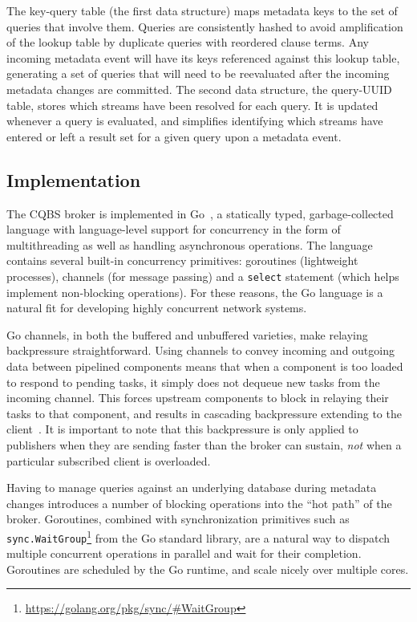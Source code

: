 The key-query table (the first data structure) maps metadata keys to the set of queries that involve them.
Queries are consistently hashed to avoid amplification of the lookup table by duplicate queries with reordered clause terms.
Any incoming metadata event will have its keys referenced against this lookup table, generating a set of queries that will need to be reevaluated after the incoming metadata changes are committed.
The second data structure, the query-UUID table, stores which streams have been resolved for each query.
It is updated whenever a query is evaluated, and simplifies identifying which streams have entered or left a result set for a given query upon a metadata event.

\subsection{Implementation}

The CQBS broker is implemented in Go~\cite{go}, a statically typed, garbage-collected language with language-level support for concurrency in the
form of multithreading as well as handling asynchronous operations.
The language contains several built-in concurrency primitives: goroutines (lightweight processes), channels (for message passing) and a \texttt{select} statement (which helps implement non-blocking operations).
For these reasons, the Go language is a natural fit for developing highly concurrent network systems.

Go channels, in both the buffered and unbuffered varieties, make relaying backpressure straightforward.
Using channels to convey incoming and outgoing data between pipelined components means that when a component is too loaded to respond to pending tasks, it simply does not dequeue new tasks from the incoming channel.
This forces upstream components to block in relaying their tasks to that component, and results in cascading backpressure extending to the client~\cite{welsh2001seda}.
It is important to note that this backpressure is only applied to publishers when they are sending faster than the broker can sustain, \emph{not} when a particular subscribed client is overloaded.

Having to manage queries against an underlying database during metadata changes introduces a number of blocking operations into the ``hot path'' of the broker.
Goroutines, combined with synchronization primitives such as \texttt{sync.WaitGroup}\footnote{\url{https://golang.org/pkg/sync/#WaitGroup}} from the Go standard library, are a natural way to dispatch multiple concurrent operations in parallel and wait for their completion.
Goroutines are scheduled by the Go runtime, and scale nicely over multiple cores.

